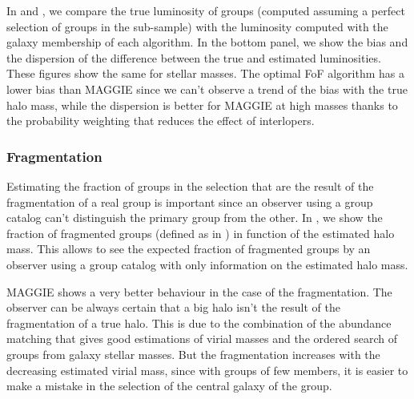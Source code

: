 In  and , we compare the
true luminosity of groups (computed assuming a perfect selection of groups in
the sub-sample) with the luminosity computed with the galaxy membership of each
algorithm. In the bottom panel, we show the bias and the dispersion of the
difference between the true and estimated luminosities. These figures show the
same for stellar masses. The optimal FoF algorithm has a lower bias than MAGGIE
since we can't observe a trend of the bias with the true halo mass, while the
dispersion is better for MAGGIE at high masses thanks to the probability
weighting that reduces the effect of interlopers.

\subsubsection{Fragmentation}

Estimating the fraction of groups in the selection that are the result of the
fragmentation of a real group is important since an observer using a group
catalog can't distinguish the primary group from the other. In
, we show the fraction of fragmented groups (defined
as in ) in function of the
estimated halo mass. This allows to see the expected fraction of fragmented
groups by an observer using a group catalog with only information on the
estimated halo mass.

MAGGIE shows a very better behaviour in the case of the fragmentation. The
observer can be always certain that a big halo isn't the result of the
fragmentation of a true halo. This is due to the combination of the abundance
matching that gives good estimations of virial masses and the ordered search
of groups from galaxy stellar masses. But the fragmentation increases with the
decreasing estimated virial mass, since with groups of few members, it is
easier to make a mistake in the selection of the central galaxy of the group.


